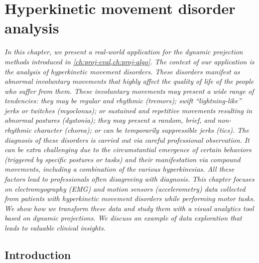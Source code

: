 \chapter{Hyperkinetic movement disorder analysis}
\label{ch:nemo}

\textit{
In this chapter, we present a real-world application for the dynamic projection methods introduced in \cref{ch:proj-eval,ch:proj-algo}. The context of our application is the analysis of hyperkinetic movement disorders. These disorders manifest as abnormal involuntary movements that highly affect the quality of life of the people who suffer from them. These involuntary movements may present a wide range of tendencies: they may be regular and rhythmic (tremors); swift ``lightning-like'' jerks or twitches (myoclonus); or sustained and repetitive movements resulting in abnormal postures (dystonia); they may present a random, brief, and non-rhythmic character (chorea); or can be temporarily suppressible jerks (tics). The diagnosis of these disorders is carried out via careful professional observation. It can be extra challenging due to the circumstantial emergence of certain behaviors (triggered by specific postures or tasks) and their manifestation via compound movements, including a combination of the various hyperkinesias. All these factors lead to professionals often disagreeing with diagnosis. 
This chapter focuses on electromyography (EMG) and motion sensors (accelerometry) data collected from patients with hyperkinetic movement disorders while performing motor tasks. We show how we transform these data and study them with a visual analytics tool based on dynamic projections. We discuss an example of data exploration that leads to valuable clinical insights.
}

\vspace{5mm} %



\section{Introduction}


